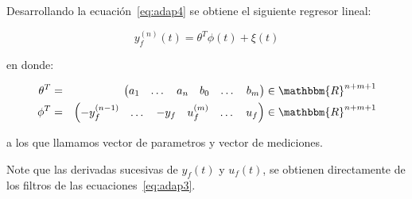        Desarrollando la ecuación~\ref{eq:adap4} se obtiene el siguiente regresor lineal:

        \begin{equation}
            y_f^{(n)}(t) = \theta^T \phi(t) + \xi(t)
        \end{equation}

        en donde:

        \begin{eqnarray*}
            \theta^T & = & \begin{pmatrix} a_1 & \dots & a_n & b_0 & \dots & b_m \end{pmatrix} \in \mathbbm{R}^{n+m+1} \\
            \phi^T & = & \begin{pmatrix} -y_f^{(n-1)} & \dots & -y_f & u_f^{(m)} & \dots & u_f \end{pmatrix} \in \mathbbm{R}^{n+m+1}
        \end{eqnarray*}

        a los que llamamos vector de parametros y vector de mediciones.

        Note que las derivadas sucesivas de $y_f(t)$ y $u_f(t)$, se obtienen directamente de los filtros de las ecuaciones~\ref{eq:adap3}.

